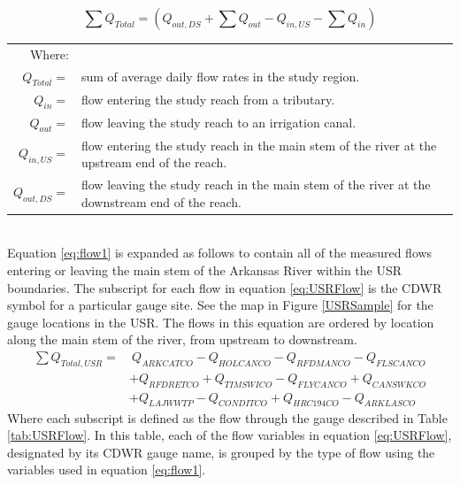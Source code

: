 \begin{linenumbers}
\begin{equation}
\label{eq:flow1}
\sum Q_{Total} = \left( Q_{out,DS} + \sum Q_{out} - Q_{in,US} - \sum Q_{in} \right) 
\end{equation}
\begin{tabular}{r p{5.5in}}
	Where: & \\
	$ Q_{Total} = $ & sum of average daily flow rates in the study region.\\
	$ Q_{in} = $ & flow entering the study reach from a tributary.\\
	$ Q_{out} = $ & flow leaving the study reach to an irrigation canal.\\
	$ Q_{in,US} = $ & flow entering the study reach in the main stem of the river at the upstream end of the reach.\\
	$ Q_{out,DS} = $ & flow leaving the study reach in the main stem of the river at the downstream end of the reach.\\
\end{tabular}\\

Equation \ref{eq:flow1} is expanded as follows to contain all of the measured flows entering or leaving the main stem of the Arkansas River within the USR boundaries.  The subscript for each flow in equation \ref{eq:USRFlow} is the CDWR symbol for a particular gauge site.  See the map in Figure \ref{USRSample} for the gauge locations in the USR.  The flows in this equation are ordered by location along the main stem of the river, from upstream to downstream.
\begin{align}
	\label{eq:USRFlow}
	\sum Q_{Total,USR} = &~Q_{ARKCATCO} - Q_{HOLCANCO} - Q_{RFDMANCO} - Q_{FLSCANCO} \\
	\nonumber & + Q_{RFDRETCO} + Q_{TIMSWICO} - Q_{FLYCANCO} + Q_{CANSWKCO} \\ 
	\nonumber & + Q_{LAJWWTP} - Q_{CONDITCO} + Q_{HRC194CO} - Q_{ARKLASCO}
\end{align}
Where each subscript is defined as the flow through the gauge described in Table \ref{tab:USRFlow}.  In this table, each of the flow variables in equation \ref{eq:USRFlow}, designated by its CDWR gauge name, is grouped by the type of flow using the variables used in equation \ref{eq:flow1}.


\end{linenumbers}
